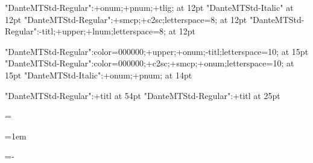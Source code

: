 






\font\twelverm 	"DanteMTStd-Regular":+onum;+pnum;+tlig; at 12pt
\font\twelveit 	"DanteMTStd-Italic" at 12pt
\font\twelvesc 	"DanteMTStd-Regular":+smcp;+c2sc;letterspace=8; at 12pt
\font\twelvetit "DanteMTStd-Regular":-titl;+upper;+lnum;letterspace=8; at 12pt

\font\fourteentit "DanteMTStd-Regular":color=000000;+upper;+onum;-titl;letterspace=10; at 15pt
\font\fourteensc "DanteMTStd-Regular":color=000000;+c2sc;+smcp;+onum;letterspace=10; at 15pt
\font\fourteenit "DanteMTStd-Italic":+onum;+pnum; at 14pt

\font\fiftyfourtit "DanteMTStd-Regular":+titl at 54pt
\font\dcquotefont "DanteMTStd-Regular":+titl at 25pt

\def\dccapfont{\fiftyfourtit\red}

\def\secIfontA{\thirteenrm}
\def\secIfontB{\eighteenrm}

\def\secIIfont{\twelvetit}


\def\normalsize{%
	\gdef\rm{\twelverm}%
	\gdef\it{\twelveit}%
	\gdef\sc{\twelvesc}%
	\gdef\tit{\twelvetit}%
}

\def\emph{\it}

\normalsize\rm



\baselineskip=14.06pt

\topskip=\baselineskip

\frenchspacing

\parskip=0pt

\parindent=1em

\lineskiplimit=-\maxdimen
{}

\emergencystretch=0pt
\hfuzz=0pt


